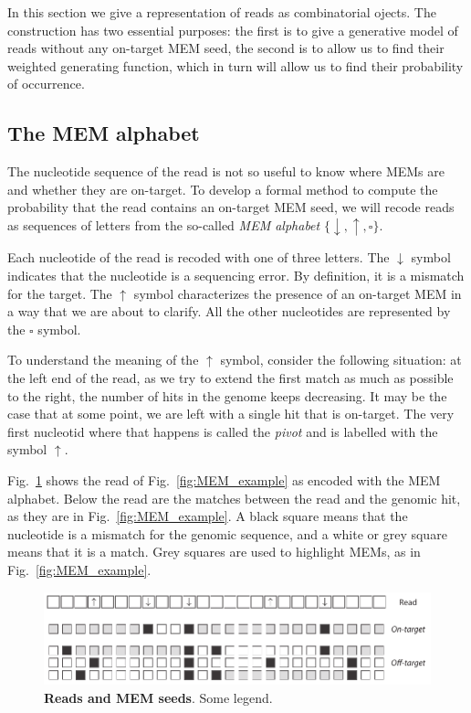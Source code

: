 \documentclass{article}
\begin{document}
In this section we give a representation of reads as combinatorial ojects.
The construction has two essential purposes: the first is to give a
generative model of reads without any on-target MEM seed, the second is to
allow us to find their weighted generating function, which in turn will
allow us to find their probability of occurrence.

\subsection{The MEM alphabet}

The nucleotide sequence of the read is not so useful to know where MEMs
are and whether they are on-target. To develop a formal method to compute
the probability that the read contains an on-target MEM seed, we will
recode reads as sequences of letters from the so-called \emph{MEM
alphabet} $\{\downarrow, \uparrow, \square\}$.

Each nucleotide of the read is recoded with one of three letters. The
$\downarrow$ symbol indicates that the nucleotide is a sequencing error.
By definition, it is a mismatch for the target. The $\uparrow$ symbol
characterizes the presence of an on-target MEM in a way that we are about
to clarify. All the other nucleotides are represented by the $\square$
symbol.

To understand the meaning of the $\uparrow$ symbol, consider the following
situation: at the left end of the read, as we try to extend the first
match as much as possible to the right, the number of hits in the genome
keeps decreasing. It may be the case that at some point, we are left with
a single hit that is on-target. The very first nucleotid where that
happens is called the \emph{pivot} and is labelled with the symbol
$\uparrow$.

Fig.~\ref{fig:sketch_MEM} shows the read of Fig.~\ref{fig:MEM_example} as
encoded with the MEM alphabet. Below the read are the matches between the
read and the genomic hit, as they are in Fig.~\ref{fig:MEM_example}. A
black square means that the nucleotide is a mismatch for the genomic
sequence, and a white or grey square means that it is a match. Grey
squares are used to highlight MEMs, as in Fig.~\ref{fig:MEM_example}.


\begin{figure}[h]
\centering
\includegraphics[scale=.85]{sketch_MEM.pdf}
\caption{\textbf{Reads and MEM seeds}. 
Some legend.}
\label{fig:sketch_MEM}
\end{figure}
\end{document}
